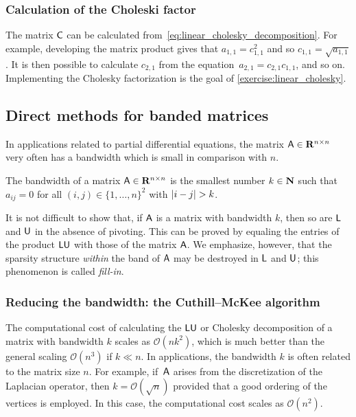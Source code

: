 \subsubsection*{Calculation of the Choleski factor}%

The matrix $\mathsf C$ can be calculated from~\eqref{eq:linear_cholesky_decomposition}.
For example, developing the matrix product gives that $a_{1,1} = c_{1, 1}^2$ and so $c_{1, 1} = \sqrt{a_{1,1}}$.
It is then possible to calculate $c_{2,1}$ from the equation~$a_{2, 1} = c_{2, 1} c_{1, 1}$, and so on.
Implementing the Cholesky factorization is the goal of \cref{exercise:linear_cholesky}.

\subsection{Direct methods for banded matrices}%

In applications related to partial differential equations,
the matrix $\mathsf A \in \mathbf R^{n \times n}$ very often has a bandwidth which is small in comparison with $n$.
\begin{definition}
    The bandwidth of a matrix $\mathsf A \in \mathbf R^{n \times n}$ is the smallest number $k \in \mathbf N$ such that
    $a_{ij} = 0$ for all $(i, j) \in \{1, \dotsc, n\}^2$ with $\lvert i - j\rvert > k$.
\end{definition}
It is not difficult to show that,
if $\mathsf A$ is a matrix with bandwidth $k$,
then so are $\mathsf L$ and $\mathsf U$ in the absence of pivoting.
This can be proved by equaling the entries of the product $\mathsf L \mathsf U$ with those of the matrix $\mathsf A$.
We emphasize, however, that the sparsity structure \emph{within} the band of $\mathsf A$ may be destroyed in $\mathsf L$ and $\mathsf U$;
this phenomenon is called \emph{fill-in}.

\subsubsection{Reducing the bandwidth: the Cuthill--McKee algorithm~\moreinfo}%
\label{ssub:reducing_the_bandwidth_the_cuthill_mckee_algorithm}

The computational cost of calculating the $\mathsf L \mathsf U$ or Cholesky decomposition of a matrix with bandwidth $k$ scales as $\mathcal O(n k^2)$,
which is much better than the general scaling $\mathcal O(n^3)$ if $k \ll n$.
In applications, the bandwidth $k$ is often related to the matrix size $n$.
For example, if~$\mathsf A$ arises from the discretization of the Laplacian operator, then $k = \mathcal O(\sqrt{n})$
provided that a good ordering of the vertices is employed.
In this case, the computational cost scales as $\mathcal O(n^2)$.

